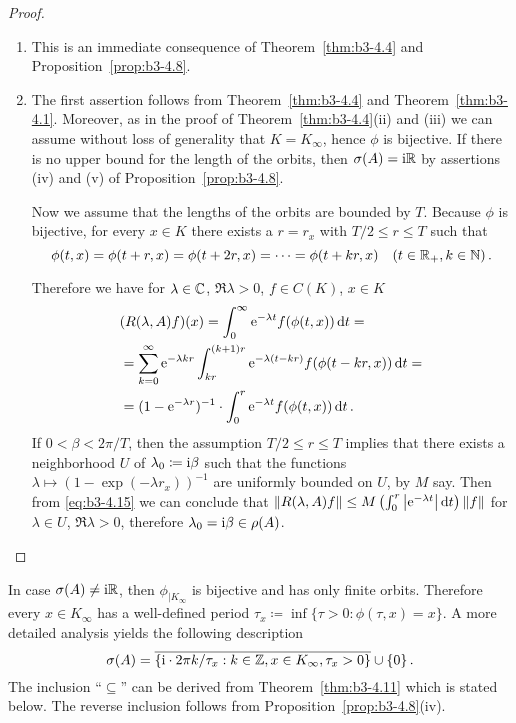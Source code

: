 \begin{proof}
\begin{enumerate}[\upshape (i), wide, labelindent=.5em]%
\item 
	This is an immediate consequence of Theorem~\ref{thm:b3-4.4} and Proposition~\ref{prop:b3-4.8}.
	
\item 
	The first assertion follows from Theorem~\ref{thm:b3-4.4} and Theorem~\ref{thm:b3-4.1}.
	Moreover, as in the proof of Theorem~\ref{thm:b3-4.4}(ii) and (iii) we can assume without loss of generality that $K = K_{\infty}$, hence $\phi$ is bijective.
	If there is no upper bound for the length of the orbits, then $\sigma(A) = \mathrm{i}\mathbb{R}$ by assertions (iv) and (v) of Proposition~\ref{prop:b3-4.8}.
	
	Now we assume that the lengths of the orbits are bounded by $T$.
	Because $\phi$ is bijective, for every $x \in K$ there exists a $r = r_{x}$ with $T/2 \leq r \leq T$ such that 
	\[
	\phi(t,x) = \phi(t+r,x) = \phi(t+2r,x) = \cdots = \phi(t+kr,x) \quad (t \in \mathbb{R}_{+}, k \in \mathbb{N})\,.
	\]
	
	Therefore we have for $\lambda \in \mathbb{C}$, $\Re\lambda > 0$, $f \in C(K)$, $x \in K$
	\begin{equation}\label{eq:b3-4.15}
		\begin{aligned}
			&(R(\lambda,A)f)(x) = \int_{0}^{\infty} \mathrm{e}^{-\lambda t}f(\phi(t,x)) \mathop{}\!\mathrm{d}{t} = \\
			&= \sum_{k=0}^{\infty} \mathrm{e}^{-\lambda kr}\int_{kr}^{(k+1)r} \mathrm{e}^{-\lambda(t-kr)} f(\phi(t-kr,x)) \mathop{}\!\mathrm{d}{t} =  \\
			&= (1 - \mathrm{e}^{-\lambda r})^{-1}\cdot\int_{0}^{r} \mathrm{e}^{-\lambda t} f(\phi(t,x)) \mathop{}\!\mathrm{d}{t}\,.
		\end{aligned}
	\end{equation}
	If $0 < \beta < 2\pi/T$, then the assumption $T/2 \leq r \leq T$ implies that there exists a neighborhood $U$ of $\lambda_{0} \coloneq \mathrm{i}\beta$ such that the functions $\lambda \mapsto (1 - \exp(-\lambda r_{x}))^{-1}$ are uniformly bounded on $U$, by $M$ say.
    Then from \eqref{eq:b3-4.15} we can conclude that $\|R(\lambda,A)f\| \leq M\left(\int_{0}^{r} \left|\mathrm{e}^{-\lambda t}\right|\mathop{}\!\mathrm{d}{t}\right)\|f\|$ for $\lambda \in U$, $\Re\lambda > 0$, therefore $\lambda_{0} = \mathrm{i}\beta \in \rho(A)$.
\end{enumerate}
\end{proof}
\begin{remark}\label{rem:b3-4.10}
	In case $\sigma(A) \neq \mathrm{i}\mathbb{R}$, then $\phi_{|K_{\infty}}$ is bijective and has only finite orbits.
	Therefore every $x \in K_{\infty}$ has a well-defined period $\tau_{x} \coloneq \inf\{\tau > 0 : \phi(\tau,x) = x\}$.
	A more detailed analysis yields the following description 
	\begin{equation}\label{eq:b3-4.16}
		\sigma(A) = \overline{\{\mathrm{i} \cdot 2\pi k/\tau_{x} : k \in \mathbb{Z}, x \in K_{\infty}, \tau_{x} > 0\}} \cup \{0\}\,.
	\end{equation}
	The inclusion \enquote{$\subseteq$} can be derived from Theorem~\ref{thm:b3-4.11} which is stated below.
	The reverse inclusion follows from Proposition~\ref{prop:b3-4.8}(iv).
\end{remark}
	
